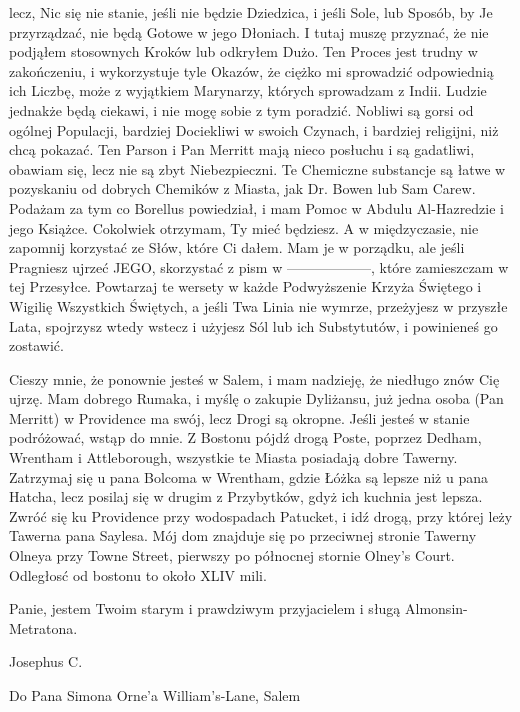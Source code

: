\begin{displayquote}
lecz, Nic się nie stanie, jeśli nie będzie Dziedzica, i jeśli Sole, lub Sposób, by Je przyrządzać, nie będą Gotowe w jego Dłoniach. I tutaj muszę przyznać, że nie podjąłem stosownych Kroków lub odkryłem Dużo. Ten Proces jest trudny w zakończeniu, i wykorzystuje tyle Okazów, że ciężko mi sprowadzić odpowiednią ich Liczbę, może z wyjątkiem Marynarzy, których sprowadzam z Indii. Ludzie jednakże będą ciekawi, i nie mogę sobie z tym poradzić. Nobliwi są gorsi od ogólnej Populacji, bardziej Dociekliwi w swoich Czynach, i bardziej religijni, niż chcą pokazać. Ten Parson i Pan Merritt mają nieco posłuchu i są gadatliwi, obawiam się, lecz nie są zbyt Niebezpieczni. Te Chemiczne substancje są łatwe w pozyskaniu od dobrych Chemików z Miasta, jak Dr. Bowen lub Sam Carew. Podażam za tym co Borellus powiedział, i mam Pomoc w Abdulu Al-Hazredzie i jego Książce. Cokolwiek otrzymam, Ty mieć będziesz. A w międzyczasie, nie zapomnij korzystać ze Słów, które Ci dałem. Mam je w porządku, ale jeśli Pragniesz ujrzeć JEGO, skorzystać z pism w  ——————, które zamieszczam w tej Przesyłce. Powtarzaj te wersety w każde Podwyższenie Krzyża Świętego i Wigilię Wszystkich Świętych, a jeśli Twa Linia nie wymrze, przeżyjesz w przyszłe Lata, spojrzysz wtedy wstecz i użyjesz Sól lub ich Substytutów, i powinieneś go zostawić. 

Cieszy mnie, że ponownie jesteś w Salem, i mam nadzieję, że niedługo znów Cię ujrzę. Mam dobrego Rumaka, i myślę o zakupie Dyliżansu, już jedna osoba (Pan Merritt) w Providence ma swój, lecz Drogi są okropne. Jeśli jesteś w stanie podróżować, wstąp do mnie. Z Bostonu pójdź drogą Poste, poprzez Dedham, Wrentham i Attleborough, wszystkie te Miasta posiadają dobre Tawerny. Zatrzymaj się u pana Bolcoma w Wrentham, gdzie Łóżka są lepsze niż u pana Hatcha, lecz posilaj się w drugim z Przybytków, gdyż ich kuchnia jest lepsza. Zwróć się ku Providence przy wodospadach Patucket, i idź drogą, przy której leży Tawerna pana Saylesa. Mój dom znajduje się po przeciwnej stronie Tawerny Olneya przy Towne Street, pierwszy po północnej stornie Olney's Court. Odległosć od bostonu to około XLIV mili. 

Panie, jestem Twoim starym i prawdziwym przyjacielem i sługą Almonsin-Metratona.

\begin{flushright}
Josephus C.
\end{flushright}

Do Pana Simona Orne'a
William's-Lane, Salem

\end{displayquote}

